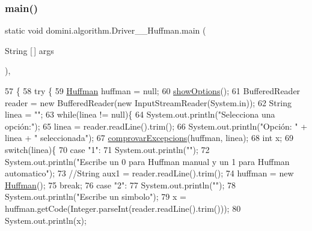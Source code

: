 \subsubsection{\texorpdfstring{main()}{main()}}
{\footnotesize\ttfamily static void domini.\+algorithm.\+Driver\+\_\+\+\_\+\+Huffman.\+main (\begin{DoxyParamCaption}\item[{String \mbox{[}$\,$\mbox{]}}]{args }\end{DoxyParamCaption})\hspace{0.3cm}{\ttfamily [inline]}, {\ttfamily [static]}}


\begin{DoxyCode}
57                                            \{
58     \textcolor{keywordflow}{try} \{
59         \hyperlink{classHuffman}{Huffman} huffman = null;
60         \hyperlink{classdomini_1_1algorithm_1_1Driver____Huffman_a0504e4a97aa7c7a0ad7c1a75187adb10}{showOptions}();
61         BufferedReader reader = \textcolor{keyword}{new} BufferedReader(\textcolor{keyword}{new} InputStreamReader(System.in));
62         String linea = \textcolor{stringliteral}{""};
63         \textcolor{keywordflow}{while}(linea != null)\{
64             System.out.println(\textcolor{stringliteral}{"Selecciona una opción:"});
65             linea = reader.readLine().trim();
66             System.out.println(\textcolor{stringliteral}{"Opción: "} + linea + \textcolor{stringliteral}{" seleccionada"});
67             \hyperlink{classdomini_1_1algorithm_1_1Driver____Huffman_a5d56f18f1d8f96dfc735b9a127094319}{comprovarExcepcions}(huffman, linea);
68             \textcolor{keywordtype}{int} x;
69             \textcolor{keywordflow}{switch}(linea)\{
70                 \textcolor{keywordflow}{case} \textcolor{stringliteral}{"1"}:
71                     System.out.println(\textcolor{stringliteral}{""});
72                     System.out.println(\textcolor{stringliteral}{"Escribe un 0 para Huffman manual y un 1 para Huffman automatico"});
73                     \textcolor{comment}{//String aux1 = reader.readLine().trim();}
74                     huffman = \textcolor{keyword}{new} \hyperlink{classHuffman}{Huffman}();
75                 \textcolor{keywordflow}{break};
76                 \textcolor{keywordflow}{case} \textcolor{stringliteral}{"2"}:
77                     System.out.println(\textcolor{stringliteral}{""});
78                     System.out.println(\textcolor{stringliteral}{"Escribe un simbolo"});
79                     x = huffman.getCode(Integer.parseInt(reader.readLine().trim()));
80                     System.out.println(x);

\end{DoxyCode}
